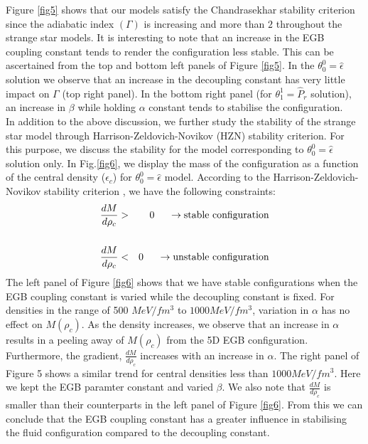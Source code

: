 \documentclass[]{aastex631}
\begin{document}
    Figure \ref{fig5} shows that our models satisfy the Chandrasekhar stability criterion since the adiabatic index $(\Gamma)$ is increasing and more than $2$ throughout the strange star models. It is interesting to note that an increase in the EGB coupling constant tends to render the configuration less stable. This can be ascertained from the top and bottom left panels of Figure \ref{fig5}. In the $\theta^0_0=\hat{\epsilon}$ solution we observe that an increase in the decoupling constant has very little impact on $\Gamma$ (top right panel). In the bottom right panel (for $\theta^1_1=\hat{P}_r$ solution), an increase in $\beta$ while holding $\alpha$ constant tends to stabilise the configuration. \\
In addition to the above discussion, we further study the stability of the strange star model through Harrison-Zeldovich-Novikov (HZN) stability criterion. For this purpose, we discuss the stability for the model corresponding to  $\theta_0^0=\hat{\epsilon}$ solution only. In Fig.\ref{fig6}, we display the mass of the configuration as a function of the central density ($\epsilon_c$) for $\theta_0^0=\hat{\epsilon}$ model. According to the Harrison-Zeldovich-Novikov stability criterion \citep{harris,zeld}, we have the following constraints:
    \begin{eqnarray}
    \frac{dM}{d\rho_c} &>& 0 \hspace{0.5cm} \rightarrow \mbox{stable configuration}\\ \nonumber \\
  \frac{dM}{d\rho_c} &<& 0 \hspace{0.5cm} \rightarrow \mbox{unstable configuration}  
        \end{eqnarray}
   The left panel of Figure \ref{fig6} shows that we have stable configurations when the EGB coupling constant is varied while the decoupling constant is fixed. For densities in the range of 500 $MeV/fm^3$ to $1000 MeV/fm^3$, variation in $\alpha$ has no effect on $M(\rho_c)$. As the density increases, we observe that an increase in $\alpha$ results in a peeling away of $M(\rho_c)$ from the 5D EGB configuration. Furthermore, the gradient, $\frac{dM}{d\rho_c}$ increases with an increase in $\alpha$. The right panel of Figure 5 shows a similar trend for central densities less than $1000 MeV/fm^3$. Here we kept the EGB paramter constant and varied $\beta$. We also note that $\frac{dM}{d\rho_c}$ is smaller than their counterparts in the left panel of Figure \ref{fig6}. From this we can conclude that the EGB coupling constant has a greater influence in stabilising the fluid configuration compared to the decoupling constant. 
\end{document}
